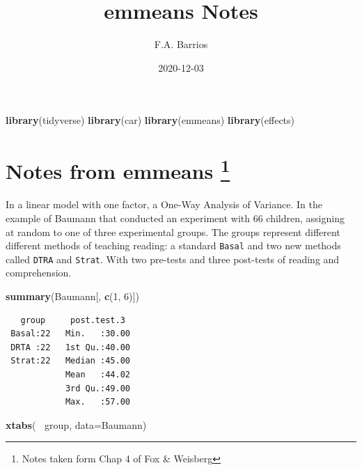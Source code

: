 \documentclass[
]{article}
\title{emmeans Notes}
\author{F.A. Barrios}
\date{2020-12-03}
\newenvironment{Shaded}{\begin{snugshade}}{\end{snugshade}}
\newcommand{\DataTypeTok}[1]{\textcolor[rgb]{0.13,0.29,0.53}{#1}}
\newcommand{\DecValTok}[1]{\textcolor[rgb]{0.00,0.00,0.81}{#1}}
\newcommand{\KeywordTok}[1]{\textcolor[rgb]{0.13,0.29,0.53}{\textbf{#1}}}
\newcommand{\NormalTok}[1]{#1}
\newcommand{\OperatorTok}[1]{\textcolor[rgb]{0.81,0.36,0.00}{\textbf{#1}}}
\newcommand{\StringTok}[1]{\textcolor[rgb]{0.31,0.60,0.02}{#1}}
\begin{document}
\maketitle

\begin{Shaded}
\begin{Highlighting}[]
\KeywordTok{library}\NormalTok{(tidyverse)}
\KeywordTok{library}\NormalTok{(car)}
\KeywordTok{library}\NormalTok{(emmeans)}
\KeywordTok{library}\NormalTok{(effects)}
\end{Highlighting}
\end{Shaded}

\hypertarget{notes-from-emmeans-1}{%
\section[Notes from emmeans ]{\texorpdfstring{Notes from emmeans
\footnote{Notes taken form Chap 4 of Fox \& Weisberg}}{Notes from emmeans }}\label{notes-from-emmeans-1}}

In a linear model with one factor, a One-Way Analysis of Variance. In
the example of Baumann that conducted an experiment with 66 children,
assigning at random to one of three experimental groups. The groups
represent different different methods of teaching reading: a standard
\texttt{Basal} and two new methods called \texttt{DTRA} and
\texttt{Strat}. With two pre-tests and three post-tests of reading and
comprehension.

\begin{Shaded}
\begin{Highlighting}[]
\KeywordTok{summary}\NormalTok{(Baumann[, }\KeywordTok{c}\NormalTok{(}\DecValTok{1}\NormalTok{, }\DecValTok{6}\NormalTok{)]) }
\end{Highlighting}
\end{Shaded}

\begin{verbatim}
   group     post.test.3   
 Basal:22   Min.   :30.00  
 DRTA :22   1st Qu.:40.00  
 Strat:22   Median :45.00  
            Mean   :44.02  
            3rd Qu.:49.00  
            Max.   :57.00  
\end{verbatim}

\begin{Shaded}
\begin{Highlighting}[]
\KeywordTok{xtabs}\NormalTok{(}\OperatorTok{~}\StringTok{ }\NormalTok{group, }\DataTypeTok{data=}\NormalTok{Baumann)}
\end{Highlighting}
\end{Shaded}
\end{document}
